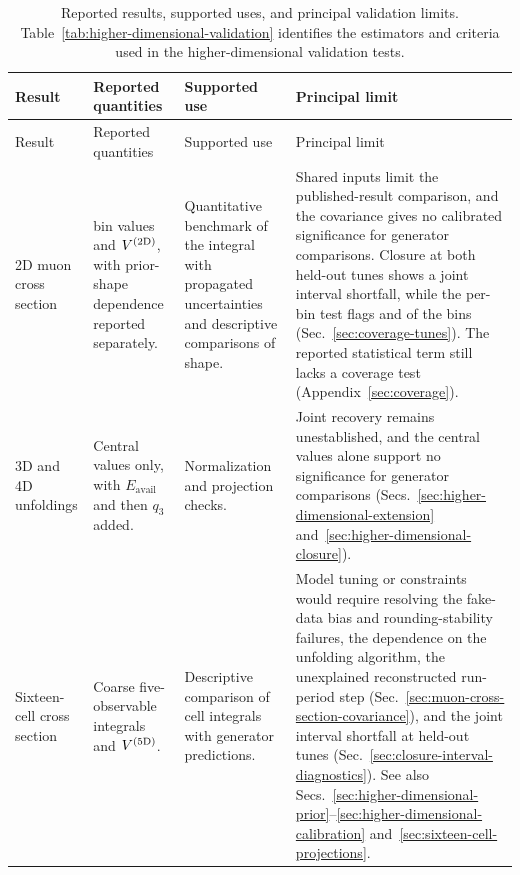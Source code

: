 \begingroup
\setlength{\LTcapwidth}{\textwidth}
\begin{xltabular}{\textwidth}{@{}>{\footnotesize\RaggedRight\arraybackslash{}\hsize}X
                                 >{\footnotesize\RaggedRight\arraybackslash{}\hsize}X >{\footnotesize\RaggedRight\arraybackslash{}\hsize}X >{\footnotesize\RaggedRight\arraybackslash{}\hsize}X@{}}
  \caption{Reported results, supported uses, and principal validation limits. Table~\ref{tab:higher-dimensional-validation} identifies the estimators and criteria used in the higher-dimensional validation tests.}
  \label{tab:validity}\label{tab:result-status}\\
    \toprule Result & Reported quantities & Supported use & Principal limit \\
    \midrule \endfirsthead \toprule Result & Reported quantities & Supported use & Principal limit \\
    \midrule \endhead \bottomrule \endlastfoot 2D muon cross section &  bin values and $V^{(2\mathrm{D})}$, with prior-shape dependence reported separately. & Quantitative benchmark of the integral with propagated uncertainties and descriptive comparisons of shape. & Shared inputs limit the published-result comparison, and the covariance gives no calibrated significance for generator comparisons. Closure at both held-out tunes shows a joint interval shortfall, while the per-bin test flags  and  of the  bins (Sec.~\ref{sec:coverage-tunes}). The reported statistical term still lacks a coverage test (Appendix~\ref{sec:coverage}). \\
    \addlinespace 3D and 4D unfoldings & Central values only, with $E_{\mathrm{avail}}$ and then $q_3$ added. & Normalization and projection checks. & Joint recovery remains unestablished, and the central values alone support no significance for generator comparisons (Secs.~\ref{sec:higher-dimensional-extension} and~\ref{sec:higher-dimensional-closure}). \\
    \addlinespace Sixteen-cell cross section & Coarse five-observable integrals and $V^{(5\mathrm{D})}$. & Descriptive comparison of cell integrals with generator predictions. & Model tuning or constraints would require resolving the fake-data bias and rounding-stability failures, the dependence on the unfolding algorithm, the unexplained reconstructed run-period step (Sec.~\ref{sec:muon-cross-section-covariance}), and the joint interval shortfall at held-out tunes (Sec.~\ref{sec:closure-interval-diagnostics}). See also Secs.~\ref{sec:higher-dimensional-prior}--\ref{sec:higher-dimensional-calibration} and~\ref{sec:sixteen-cell-projections}. \\

\end{xltabular}
